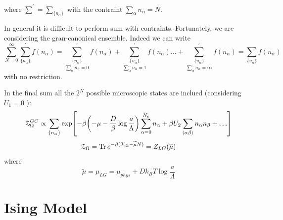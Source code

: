 \documentclass[../main/main.tex]{subfiles}
\begin{document}
where \( \sum_{}^{'} = \sum_{\{ n_ \alpha  \} }^{}     \)  with the contraint \( \sum_{\alpha }^{} n_ \alpha = N   \).
\begin{remark}
In general it is difficult to perform sum with contraints. Fortunately, we are considering the gran-canonical ensemble.
Indeed we can write
\begin{equation}
  \sum_{N=0}^{\infty} \sum_{\{ n_ \alpha  \}}^{'} f(n_ \alpha ) =   \underset{\sum_{\alpha }^{} n_ \alpha =0 }{\sum_{\{ n_ \alpha  \} }^{'}} f (n_ \alpha )  +
  \underset{\sum_{\alpha }^{} n_ \alpha =1 }{\sum_{\{ n_ \alpha  \} }^{'}} f (n_ \alpha )
  \dots +
    \underset{\sum_{\alpha }^{} n_ \alpha = \infty }{\sum_{\{ n_ \alpha  \} }^{'}} f (n_ \alpha ) =  \sum_{\{ n_ \alpha  \}} f(n_ \alpha )
\end{equation}
with no restriction.
\end{remark}
\begin{remark}
In the final sum all the \( 2^N \) possible microscopic states are inclued (considering \( U_1 =0 \) ):
\begin{equation}
  \mathcal{Z}_ \Omega ^{GC} \propto  \sum_{\{ n_ \alpha  \}} \exp [-\beta \qty(-\mu - \frac{D}{\beta } \log{\frac{a}{\Lambda }} ) \sum_{\alpha =0}^{N_c} n_ \alpha  + \beta U_2 \sum_{\expval{\alpha \beta } }^{} n_ \alpha n_ \beta + \dots     ]
\end{equation}
\begin{equation}
  \mathcal{Z}_ \Omega = \Tr e^{-\beta ( \mathcal{H}_ \Omega - \widetilde{\mu} N )} = Z_{LG} ( \widetilde{\mu } )
\end{equation}
where
\begin{equation}
  \widetilde{\mu } = \mu _{LG} = \mu _{phys} + D k_B T \log{\frac{a}{\Lambda }}
\end{equation}
\end{remark}
\clearpage


\section{Ising Model}
\end{document}
